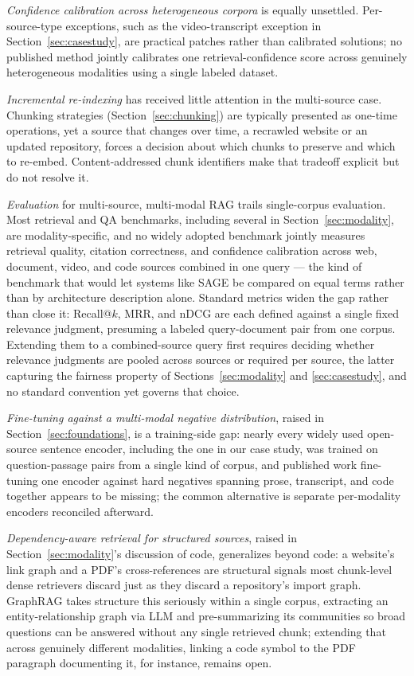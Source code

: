 \documentclass[conference]{IEEEtran}
\begin{document}
\emph{Confidence calibration across heterogeneous corpora} is equally unsettled. Per-source-type exceptions, such as the video-transcript exception in Section~\ref{sec:casestudy}, are practical patches rather than calibrated solutions; no published method jointly calibrates one retrieval-confidence score across genuinely heterogeneous modalities using a single labeled dataset.

\emph{Incremental re-indexing} has received little attention in the multi-source case. Chunking strategies (Section~\ref{sec:chunking}) are typically presented as one-time operations, yet a source that changes over time, a recrawled website or an updated repository, forces a decision about which chunks to preserve and which to re-embed. Content-addressed chunk identifiers make that tradeoff explicit but do not resolve it.

\emph{Evaluation} for multi-source, multi-modal RAG trails single-corpus evaluation. Most retrieval and QA benchmarks, including several in Section~\ref{sec:modality}, are modality-specific, and no widely adopted benchmark jointly measures retrieval quality, citation correctness, and confidence calibration across web, document, video, and code sources combined in one query — the kind of benchmark that would let systems like SAGE be compared on equal terms rather than by architecture description alone. Standard metrics widen the gap rather than close it: Recall@$k$, MRR, and nDCG are each defined against a single fixed relevance judgment, presuming a labeled query-document pair from one corpus. Extending them to a combined-source query first requires deciding whether relevance judgments are pooled across sources or required per source, the latter capturing the fairness property of Sections~\ref{sec:modality} and \ref{sec:casestudy}, and no standard convention yet governs that choice.

\emph{Fine-tuning against a multi-modal negative distribution}, raised in Section~\ref{sec:foundations}, is a training-side gap: nearly every widely used open-source sentence encoder, including the one in our case study, was trained on question-passage pairs from a single kind of corpus, and published work fine-tuning one encoder against hard negatives spanning prose, transcript, and code together appears to be missing; the common alternative is separate per-modality encoders reconciled afterward.

\emph{Dependency-aware retrieval for structured sources}, raised in Section~\ref{sec:modality}'s discussion of code, generalizes beyond code: a website's link graph and a PDF's cross-references are structural signals most chunk-level dense retrievers discard just as they discard a repository's import graph. GraphRAG \cite{edge2024graphrag} takes structure this seriously within a single corpus, extracting an entity-relationship graph via LLM and pre-summarizing its communities so broad questions can be answered without any single retrieved chunk; extending that across genuinely different modalities, linking a code symbol to the PDF paragraph documenting it, for instance, remains open.
\end{document}
